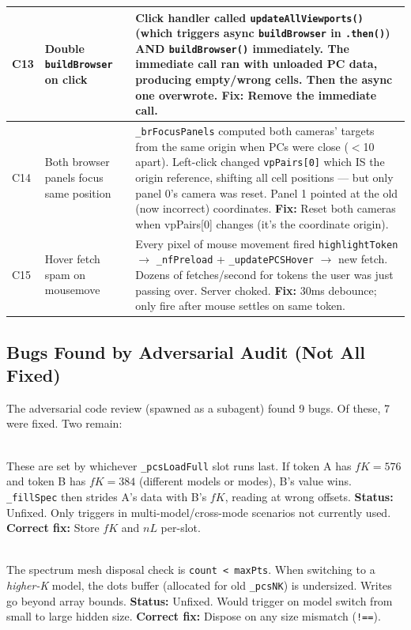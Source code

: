 \documentclass[11pt,a4paper]{article}
\begin{document}
\begin{longtable}{p{}p{}p{}}
\midrule
C13 & Double \texttt{buildBrowser} on click & Click handler called \texttt{updateAllViewports()} (which triggers async \texttt{buildBrowser} in \texttt{.then()}) AND \texttt{buildBrowser()} immediately. The immediate call ran with unloaded PC data, producing empty/wrong cells. Then the async one overwrote. \textbf{Fix:} Remove the immediate call. \\
\midrule
C14 & Both browser panels focus same position & \texttt{\_brFocusPanels} computed both cameras' targets from the same origin when PCs were close ($<$10 apart). Left-click changed \texttt{vpPairs[0]} which IS the origin reference, shifting all cell positions --- but only panel 0's camera was reset. Panel 1 pointed at the old (now incorrect) coordinates. \textbf{Fix:} Reset both cameras when vpPairs[0] changes (it's the coordinate origin). \\
\midrule
C15 & Hover fetch spam on mousemove & Every pixel of mouse movement fired \texttt{highlightToken} $\to$ \texttt{\_nfPreload} + \texttt{\_updatePCSHover} $\to$ new fetch. Dozens of fetches/second for tokens the user was just passing over. Server choked. \textbf{Fix:} 30ms debounce; only fire after mouse settles on same token. \\
\bottomrule
\end{longtable}

\subsection{Bugs Found by Adversarial Audit (Not All Fixed)}

The adversarial code review (spawned as a subagent) found 9 bugs. Of these, 7 were fixed. Two remain:

\begin{description}[style=nextline]
  \item[\textcolor{important}{Bug 4: Shared \texttt{\_pcsFullK}/\texttt{\_pcsFullNL} scalars}] \hfill \\
  These are set by whichever \texttt{\_pcsLoadFull} slot runs last. If token A has $fK=576$ and token B has $fK=384$ (different models or modes), B's value wins. \texttt{\_fillSpec} then strides A's data with B's $fK$, reading at wrong offsets. \textbf{Status:} Unfixed. Only triggers in multi-model/cross-mode scenarios not currently used. \textbf{Correct fix:} Store $fK$ and $nL$ per-slot.

  \item[\textcolor{important}{Bug 7: Mesh disposal only on growth}] \hfill \\
  The spectrum mesh disposal check is \texttt{count < maxPts}. When switching to a \emph{higher-K} model, the dots buffer (allocated for old \texttt{\_pcsNK}) is undersized. Writes go beyond array bounds. \textbf{Status:} Unfixed. Would trigger on model switch from small to large hidden size. \textbf{Correct fix:} Dispose on any size mismatch (\texttt{!==}).
\end{description}
\end{document}
